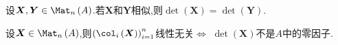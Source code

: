 \begin{corollary}{}{}
	设$\boldsymbol{X},\boldsymbol{Y}\in\Mat_{n}\left(A\right)$.若$\boldsymbol{X}$和$\boldsymbol{Y}$相似,则$\det\left(\boldsymbol{X}\right)=\det\left(\boldsymbol{Y}\right)$.
\end{corollary}

\begin{proposition}{}{}
	设$\boldsymbol{X}\in\Mat_{n}\left(A\right)$,则$\left(\col_{i}\left(\boldsymbol{X}\right)\right)_{i=1}^{n}$线性无关$\iff$ $\det\left(\boldsymbol{X}\right)$不是$A$中的零因子.
\end{proposition}




















